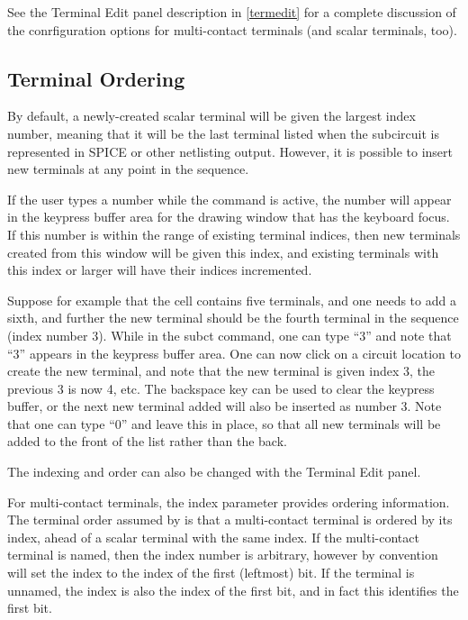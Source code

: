 See the {\cb Terminal Edit} panel description in \ref{termedit} for a
complete discussion of the conrfiguration options for multi-contact
terminals (and scalar terminals, too).

\subsection{Terminal Ordering}

By default, a newly-created scalar terminal will be given the largest
index number, meaning that it will be the last terminal listed when
the subcircuit is represented in SPICE or other netlisting output. 
However, it is possible to insert new terminals at any point in the
sequence.
 
If the user types a number while the command is active, the number
will appear in the keypress buffer area for the drawing window that
has the keyboard focus.  If this number is within the range of
existing terminal indices, then new terminals created from this window
will be given this index, and existing terminals with this index or
larger will have their indices incremented.
 
Suppose for example that the cell contains five terminals, and one
needs to add a sixth, and further the new terminal should be the
fourth terminal in the sequence (index number 3).  While in the {\cb
subct} command, one can type ``3'' and note that ``3'' appears in the
keypress buffer area.  One can now click on a circuit location to
create the new terminal, and note that the new terminal is given index
3, the previous 3 is now 4, etc.  The backspace key can be used to
clear the keypress buffer, or the next new terminal added will also be
inserted as number 3.  Note that one can type ``0'' and leave this in
place, so that all new terminals will be added to the front of the
list rather than the back.

The indexing and order can also be changed with the {\cb Terminal Edit}
panel.

For multi-contact terminals, the index parameter provides ordering
information.  The terminal order assumed by {\Xic} is that a
multi-contact terminal is ordered by its index, ahead of a scalar
terminal with the same index.  If the multi-contact terminal is named,
then the index number is arbitrary, however by convention {\Xic} will
set the index to the index of the first (leftmost) bit.  If the
terminal is unnamed, the index is also the index of the first bit, and
in fact this identifies the first bit.


